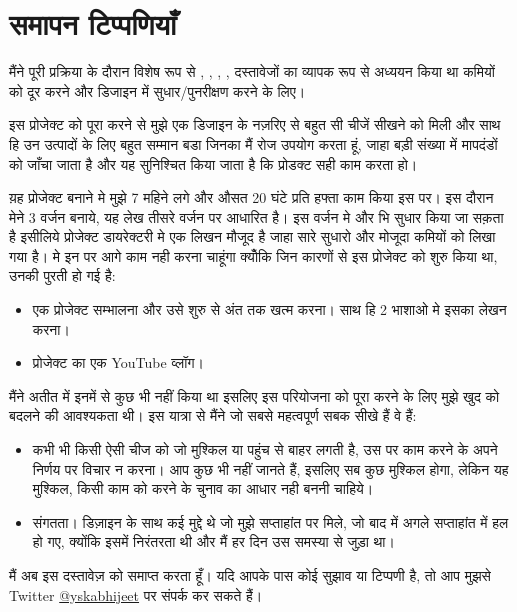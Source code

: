 \documentclass[10pt,a4paper]{article}
\begin{document}
	\pagebreak
	\section{समापन टिप्पणियाँ}

	मैंने पूरी प्रक्रिया के दौरान विशेष रूप से \cite{nxp}, \cite{ti}, \cite{micro}, \cite{oxf}, \cite{wuk} दस्तावेजों का व्यापक रूप से अध्ययन किया था कमियों को दूर करने और डिजाइन में सुधार/पुनरीक्षण करने के लिए।\par
	\bigskip
	
	इस प्रोजेक्ट को पूरा करने से मुझे एक डिजाइन के नज़रिए से बहुत सी चीजें सीखने को मिली और साथ हि उन उत्पादों के लिए बहुत सम्मान बडा जिनका मैं रोज उपयोग करता हूं, जाहा बड़ी संख्या में मापदंडों को जाँचा जाता है और यह सुनिश्चित किया जाता है कि प्रोडक्ट सही काम करता हो। 	
	
	य़ह प्रोजेक्ट बनाने मे मुझे 7 महिने लगे और औसत 20 घंटे प्रति हफ्ता काम किया इस पर। इस दौरान मेने 3 वर्जन बनाये, यह लेख तीसरे वर्जन पर आधारित है। इस वर्जन मे और भि सुधार किया जा सक़ता है इसीलिये प्रोजेक्ट डायरेक्टरी मे एक लिखन मौजूद है जाहा सारे सुधारो और मोजूदा कमियों को लिखा गया है। मे इन पर आगे काम नही करना चाहूंगा क्योँकि जिन कारणों से इस प्रोजेक्ट को शुरु किया था, उनकी पुरती हो गई है:
	
	\begin{itemize}
		\item एक प्रोजेक्ट सम्भालना और उसे शुरु से अंत तक खत्म करना। साथ हि 2 भाशाओ मे इसका लेखन करना। 
		\item प्रोजेक्ट का एक YouTube व्लॉग। 
	\end{itemize}
	
	मैंने अतीत में इनमें से कुछ भी नहीं किया था इसलिए इस परियोजना को पूरा करने के लिए मुझे खुद को बदलने की आवश्यकता थी। इस यात्रा से मैंने जो सबसे महत्वपूर्ण सबक सीखे हैं वे हैं:
	
	\begin{itemize}
		\item कभी भी किसी ऐसी चीज को जो मुश्किल या पहुंच से बाहर लगती है, उस पर काम करने के अपने निर्णय पर विचार न करना। आप कुछ भी नहीं जानते हैं, इसलिए सब कुछ मुश्किल होगा, लेकिन यह मुश्किल, किसी काम को करने के चुनाव का आधार नही बननी चाहिये।
		
		\item संगतता। डिज़ाइन के साथ कई मुद्दे थे जो मुझे सप्ताहांत पर मिले, जो बाद में अगले सप्ताहांत में हल हो गए, क्योंकि इसमें निरंतरता थी और मैं हर दिन उस समस्या से जुड़ा था।
		
	\end{itemize}
	
	\bigskip
	मैं अब इस दस्तावेज़ को समाप्त करता हूँ। यदि आपके पास कोई सुझाव या टिप्पणी है, तो आप मुझसे Twitter \href{https://twitter.com/yskabhijeet}{@yskabhijeet} पर संपर्क कर सकते हैं। 

	
\end{document}
